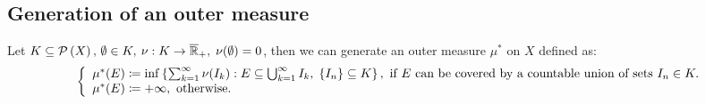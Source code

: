 \subsection{Generation of an outer measure} \label{outer:gen}
Let $K\subseteq\mathcal{P}\left(X\right), \, \emptyset\in K, \: \nu:K\to\overline{\mathbb{R}}_{+}, \; \nu(\emptyset)=0$, then we can generate an outer measure $\mu^*$ on $X$ defined as:
\[
    \left\{ \begin{array}{l}
        \mu^*(E) \coloneqq \inf \left\{ \sum_{k=1}^{\infty} \nu(I_k) : E\subseteq \bigcup_{k=1}^{\infty} I_k,\; \{ I_n \}\subseteq K \right\} , \text{ if } E \text{ can be covered by a countable union of sets } I_n\in K. \\
        \mu^*(E) \coloneqq +\infty, \text{ otherwise.}
    \end{array} \right.
\]

